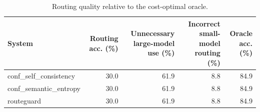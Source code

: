 \begin{table}[t]
\centering
\small
\caption{Routing quality relative to the cost-optimal oracle.}
\label{tab:routing}
\begin{tabular}{lrrrr}
\toprule
System & Routing acc. (\%) & Unnecessary large-model use (\%) & Incorrect small-model routing (\%) & Oracle acc. (\%) \\
\midrule
conf\_self\_consistency & 30.0 & 61.9 & 8.8 & 84.9 \\
conf\_semantic\_entropy & 30.0 & 61.9 & 8.8 & 84.9 \\
routeguard & 30.0 & 61.9 & 8.8 & 84.9 \\
\bottomrule
\end{tabular}
\end{table}
